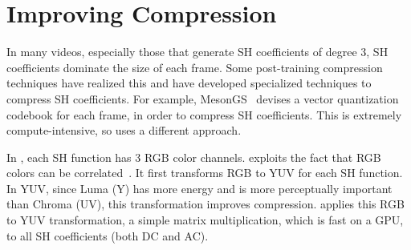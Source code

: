 \section{Improving \dgs{} Compression}\label{sec:klt}

In many \dgs{} videos, especially those that generate SH coefficients of degree 3, SH coefficients dominate the size of each \gs{} frame.
%
Some post-training compression techniques have realized this and have developed specialized techniques to compress SH coefficients.
%
For example, MesonGS~\cite{mesongs} devises a vector quantization codebook for each frame, in order to compress SH coefficients.
%
This is extremely compute-intensive, so \gsnfs{} uses a different approach. 

In \gs{}, each SH function has 3 RGB color channels.
%
\gsnfs{} exploits the fact that RGB colors can be correlated~\cite{color_correlation}.
%
It first transforms RGB to YUV for each SH function.
%
In YUV, since Luma (Y) has more energy and is more perceptually important than Chroma (UV), this transformation improves compression.
%
\gsnfs{} applies this RGB to YUV transformation, a simple matrix multiplication, which is fast on a GPU, to all SH  coefficients (both DC and AC).


